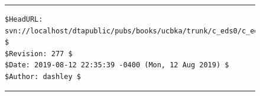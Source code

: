 

\vworkexercisechapterfooter


\vfill
\noindent\begin{figure}[!b]
\noindent\rule[-0.25in]{\textwidth}{1pt}
\begin{tiny}
\begin{verbatim}
$HeadURL: svn://localhost/dtapublic/pubs/books/ucbka/trunk/c_eds0/c_eds0.tex $
$Revision: 277 $
$Date: 2019-08-12 22:35:39 -0400 (Mon, 12 Aug 2019) $
$Author: dashley $
\end{verbatim}
\end{tiny}
\noindent\rule[0.25in]{\textwidth}{1pt}
\end{figure}

%
